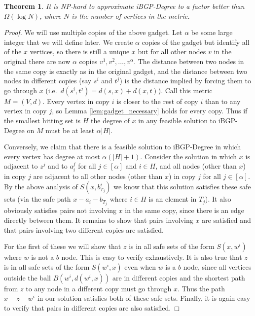 \documentclass[11pt,letterpaper]{article}
\newtheorem{theorem}{Theorem}[section]
\theoremstyle{definition}
\begin{document}
\begin{theorem}
\label{thm:iBGP_deghard}
  It is NP-hard to approximate {\sc iBGP-Degree} to a factor better than
  $\Omega(\log N)$, where $N$ is the number of vertices in the
  metric.
\end{theorem}
\begin{proof}
  We will use multiple copies of the above gadget.  Let $\alpha$ be some
  large integer that we will define later.  We create $\alpha$ copies
  of the gadget but identify all of the $x$ vertices, so there is
  still a unique $x$ but for all other nodes $v$ in the original there
  are now $\alpha$ copies $v^1, v^2, \dots, v^{\alpha}$.  The distance
  between two nodes in the same copy is exactly as in the original
  gadget, and the distance between two nodes in different copies (say
  $s^i$ and $t^j$) is the distance implied by forcing them to go
  through $x$ (i.e.~$d(s^i, t^j) = d(s,x) + d(x,t)$).  Call this
  metric $M = (V,d)$.  Every vertex in copy $i$ is closer to the rest
  of copy $i$ than to any vertex in copy $j$, so Lemma
  \ref{lem:gadget_necessary} holds for every copy.  Thus if the
  smallest hitting set is $H$ the degree of $x$ in any feasible
  solution to {\sc iBGP-Degree} on $M$ must be at least $\alpha |H|$.

  Conversely, we claim that there is a feasible solution to {\sc
    iBGP-Degree} in which every vertex has degree at most
  $\alpha(|H|+1)$.  Consider the solution in which $x$ is adjacent to
  $z^j$ and to $a_i^j$ for all $j \in [\alpha]$ and $i \in H$, and all
  nodes (other than $x$) in copy $j$ are adjacent to all other nodes
  (other than $x$) in copy $j$ for all $j \in [\alpha]$.  By the above
  analysis of $S(x, b_{T_j}^i)$ we know that this solution satisfies
  these safe sets (via the safe path $x-a_i-b_{T_j}$ where $i \in H$
  is an element in $T_j$).  It also obviously satisfies pairs not
  involving $x$ in the same copy, since there is an edge directly
  between them.  It remains to show that pairs involving $x$ are
  satisfied and that pairs involving two different copies are
  satisfied.

  For the first of these we will show that $z$ is in all safe sets of
  the form $S(x, w^i)$ where $w$ is not a $b$ node.  This is easy to
  verify exhaustively.  It is also true that $z$ is
  in all safe sets of the form $S(w^i,x)$ even when $w$ is a $b$ node,
  since all vertices outside the ball $B(w^i, d(w^i,x))$ are in
  different copies and the shortest path from $z$ to any node in a
  different copy must go through $x$.  Thus the path $x-z-w^i$ in our
  solution satisfies both of these safe sets.  Finally, it is again easy to verify that
  pairs in different copies are also satisfied.


\end{proof}
\end{document}
